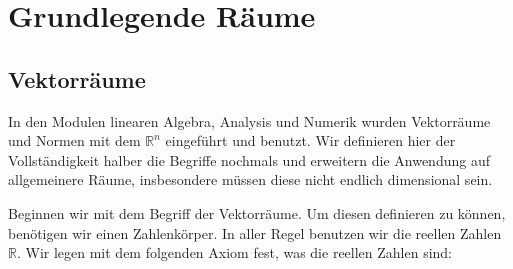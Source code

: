 \documentclass[letterpaper,10pt,english]{jupyterBook}
\begin{document}
\section{Grundlegende Räume}
\label{\detokenize{Funktionalanalysis/Funktionalanalysis:grundlegende-raume}}

\subsection{Vektorräume}
\label{\detokenize{Funktionalanalysis/Funktionalanalysis:vektorraume}}
In den Modulen linearen Algebra, Analysis und Numerik wurden Vektorräume und Normen mit dem \(\mathbb{R}^n\) eingeführt und benutzt. Wir definieren hier der Vollständigkeit halber die Begriffe nochmals und erweitern die Anwendung auf allgemeinere Räume, insbesondere müssen diese nicht endlich dimensional sein.

Beginnen wir mit dem Begriff der Vektorräume. Um diesen definieren zu können, benötigen wir einen Zahlenkörper. In aller Regel benutzen wir die reellen Zahlen \(\mathbb{R}\). Wir legen mit dem folgenden Axiom fest, was die reellen Zahlen sind:
\end{document}
